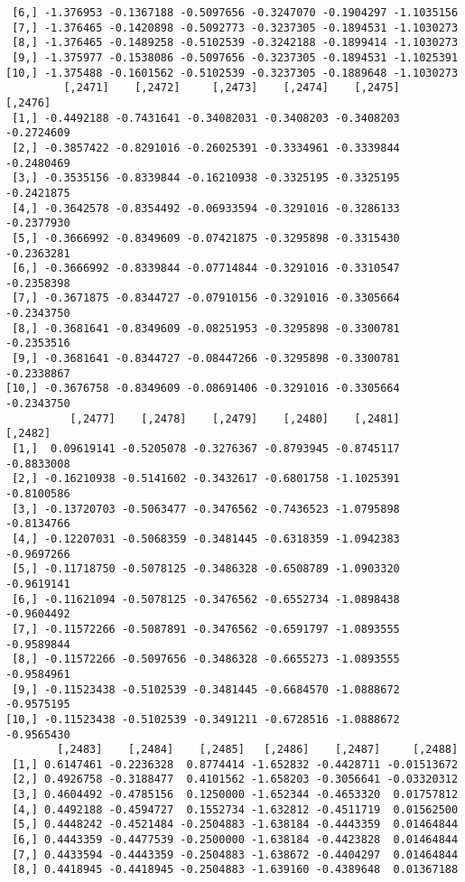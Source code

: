 \documentclass[
  letterpaper,
  DIV=11,
  numbers=noendperiod]{scrreprt}
\begin{document}
\begin{verbatim}
 [6,] -1.376953 -0.1367188 -0.5097656 -0.3247070 -0.1904297 -1.1035156
 [7,] -1.376465 -0.1420898 -0.5092773 -0.3237305 -0.1894531 -1.1030273
 [8,] -1.376465 -0.1489258 -0.5102539 -0.3242188 -0.1899414 -1.1030273
 [9,] -1.375977 -0.1538086 -0.5097656 -0.3237305 -0.1894531 -1.1025391
[10,] -1.375488 -0.1601562 -0.5102539 -0.3237305 -0.1889648 -1.1030273
         [,2471]    [,2472]     [,2473]    [,2474]    [,2475]    [,2476]
 [1,] -0.4492188 -0.7431641 -0.34082031 -0.3408203 -0.3408203 -0.2724609
 [2,] -0.3857422 -0.8291016 -0.26025391 -0.3334961 -0.3339844 -0.2480469
 [3,] -0.3535156 -0.8339844 -0.16210938 -0.3325195 -0.3325195 -0.2421875
 [4,] -0.3642578 -0.8354492 -0.06933594 -0.3291016 -0.3286133 -0.2377930
 [5,] -0.3666992 -0.8349609 -0.07421875 -0.3295898 -0.3315430 -0.2363281
 [6,] -0.3666992 -0.8339844 -0.07714844 -0.3291016 -0.3310547 -0.2358398
 [7,] -0.3671875 -0.8344727 -0.07910156 -0.3291016 -0.3305664 -0.2343750
 [8,] -0.3681641 -0.8349609 -0.08251953 -0.3295898 -0.3300781 -0.2353516
 [9,] -0.3681641 -0.8344727 -0.08447266 -0.3295898 -0.3300781 -0.2338867
[10,] -0.3676758 -0.8349609 -0.08691406 -0.3291016 -0.3305664 -0.2343750
          [,2477]    [,2478]    [,2479]    [,2480]    [,2481]    [,2482]
 [1,]  0.09619141 -0.5205078 -0.3276367 -0.8793945 -0.8745117 -0.8833008
 [2,] -0.16210938 -0.5141602 -0.3432617 -0.6801758 -1.1025391 -0.8100586
 [3,] -0.13720703 -0.5063477 -0.3476562 -0.7436523 -1.0795898 -0.8134766
 [4,] -0.12207031 -0.5068359 -0.3481445 -0.6318359 -1.0942383 -0.9697266
 [5,] -0.11718750 -0.5078125 -0.3486328 -0.6508789 -1.0903320 -0.9619141
 [6,] -0.11621094 -0.5078125 -0.3476562 -0.6552734 -1.0898438 -0.9604492
 [7,] -0.11572266 -0.5087891 -0.3476562 -0.6591797 -1.0893555 -0.9589844
 [8,] -0.11572266 -0.5097656 -0.3486328 -0.6655273 -1.0893555 -0.9584961
 [9,] -0.11523438 -0.5102539 -0.3481445 -0.6684570 -1.0888672 -0.9575195
[10,] -0.11523438 -0.5102539 -0.3491211 -0.6728516 -1.0888672 -0.9565430
        [,2483]    [,2484]    [,2485]   [,2486]    [,2487]     [,2488]
 [1,] 0.6147461 -0.2236328  0.8774414 -1.652832 -0.4428711 -0.01513672
 [2,] 0.4926758 -0.3188477  0.4101562 -1.658203 -0.3056641 -0.03320312
 [3,] 0.4604492 -0.4785156  0.1250000 -1.652344 -0.4653320  0.01757812
 [4,] 0.4492188 -0.4594727  0.1552734 -1.632812 -0.4511719  0.01562500
 [5,] 0.4448242 -0.4521484 -0.2504883 -1.638184 -0.4443359  0.01464844
 [6,] 0.4443359 -0.4477539 -0.2500000 -1.638184 -0.4423828  0.01464844
 [7,] 0.4433594 -0.4443359 -0.2504883 -1.638672 -0.4404297  0.01464844
 [8,] 0.4418945 -0.4418945 -0.2504883 -1.639160 -0.4389648  0.01367188

\end{verbatim}
\end{document}
